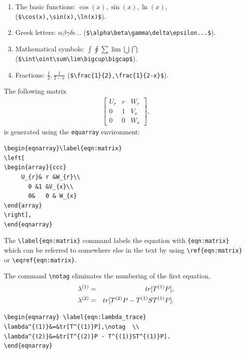 \documentclass[11pt]{book}
\begin{document}
\begin{enumerate}
\item The basic functions: $\cos(x),  \sin(x),   \ln(x) $,  (\verb+$\cos(x),\sin(x),\ln(x)$+). 
\item Greek letters: $\alpha \beta \gamma \delta\epsilon...$ (\verb+$\alpha\beta\gamma\delta\epsilon...$+).
\item Mathematical symbols: $\int  \oint \sum\lim\bigcup \bigcap$
 (\verb+$\int\oint\sum\lim\bigcup\bigcap$+).
\item Fractions: $\frac{1}{2},\frac{1}{2-x}$ (\verb+$\frac{1}{2},\frac{1}{2-x}$+).
\end{enumerate}

The following matrix 
\begin{eqnarray}\label{eqn:matrix}
\left[
\begin{array}{ccc}
	 U_{r}&     r       &   W_{r}	\\
	   0       &	1      &  V_{x}	\\
	   0	   &	0      &  W_{x}
\end{array}
\right], 
\end{eqnarray}
is generated using  the \verb+equarray+ environment:
\begin{verbatim}
\begin{eqnarray}\label{eqn:matrix}
\left[
\begin{array}{ccc}
	 U_{r}& r &W_{r}\\
	   0 &1 &V_{x}\\
	   0&	0 & W_{x}
\end{array}
\right], 
\end{eqnarray}
\end{verbatim}
The \verb+\label{eqn:matrix}+ command labels the equation with \verb+{eqn:matrix}+ which can 
be referred  to somewhere else in the text by using \verb+\ref{eqn:matrix}+ or  \verb+\eqref{eqn:matrix}+.


The command \verb+\notag+ eliminates the numbering of the first equation,
\begin{eqnarray} \label{eqn:lambda_trace}
\lambda^{(1)}&=&tr[T^{(1)}P],\notag  \\
\lambda^{(2)}&=&tr[T^{(2)}P - T^{(1)}ST^{(1)}P].
\end{eqnarray}
\begin{verbatim}
\begin{eqnarray} \label{eqn:lambda_trace}
\lambda^{(1)}&=&tr[T^{(1)}P],\notag  \\
\lambda^{(2)}&=&tr[T^{(2)}P - T^{(1)}ST^{(1)}P].
\end{eqnarray}
\end{verbatim}
\end{document}
